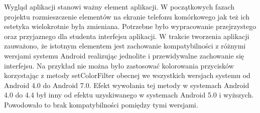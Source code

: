 \documentclass[eng]{mgr}
\begin{document}
			Wygląd aplikacji stanowi ważny element aplikacji. W początkowych fazach projektu rozmieszczenie elementów na ekranie telefonu komórkowego jak też ich estetyka wielokrotnie była zmieniana. Potrzebne było wypracowanie przejrzystego oraz przyjaznego dla studenta interfejsu aplikacji. W trakcie tworzenia aplikacji zauważono, że istotnym elementem jest zachowanie kompatybilności z różnymi wersjami systemu Android realizując jednolite i przewidywalne zachowanie się interfejsu.
			Na przykład nie można było zastosować kolorowania przycisków korzystając z metody setColorFilter obecnej we wszystkich wersjach systemu od Android 4.0 do Android 7.0. Efekt wywołania tej metody w systemach Android 4.0 do 4.4 był inny od efektu uzyskiwanego w systemach Android 5.0 i wyższych. Powodowało to brak kompatybilności pomiędzy tymi wersjami.\\
		
			\pagebreak
		
\end{document}
